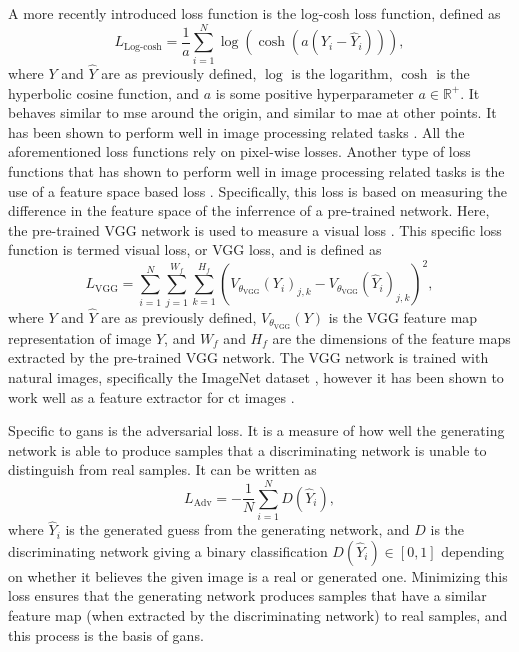 
A more recently introduced loss function is the log-cosh loss function, defined as \cite{chen2019log}
\begin{equation}
    \label{eq:losslogcosh}
    L_{\text{Log-cosh}} = \frac{1}{a} \sum_{i=1}^N \log ( \cosh ( a ( Y_i - \hat{Y}_i))),
\end{equation}
where $Y$ and $\hat{Y}$ are as previously defined, $\log$ is the logarithm, $\cosh$ is the hyperbolic cosine function, and $a$ is some positive hyperparameter $a \in \mathbb{R}^+$. It behaves similar to \acrshort{mse} around the origin, and similar to \acrshort{mae} at other points. It has been shown to perform well in image processing related tasks \cite{7797130}.
All the aforementioned loss functions rely on pixel-wise losses. Another type of loss functions that has shown to perform well in image processing related tasks is the use of a feature space based loss \cite{vggloss}. Specifically, this loss is based on measuring the difference in the feature space of the inferrence of a pre-trained network. Here, the pre-trained VGG network is used to measure a visual loss \cite{simonyan2015deep}. This specific loss function is termed visual loss, or VGG loss, and is defined as \cite{vggloss,liu2020tomogan}
\begin{equation}
    \label{eq:lossvgg}
    L_{\text{VGG}} = \sum_{i=1}^{N} \sum_{j=1}^{W_f} \sum_{k=1}^{H_f} \left(V_{\theta_{\text{VGG}}} (Y_i)_{j,k} - V_{\theta_{\text{VGG}}} (\hat{Y}_i)_{j,k} \right)^2,
\end{equation}
where $Y$ and $\hat{Y}$ are as previously defined, $V_{\theta_{\text{VGG}}}(Y)$ is the VGG feature map representation of image $Y$, and $W_f$ and $H_f$ are the dimensions of the feature maps extracted by the pre-trained VGG network. The VGG network is trained with natural images, specifically the ImageNet dataset \cite{deng2009imagenet}, however it has been shown to work well as a feature extractor for \acrshort{ct} images \cite{8340157}. 

Specific to \acrshort{gan}s is the adversarial loss. It is a measure of how well the generating network is able to produce samples that a discriminating network is unable to distinguish from real samples. It can be written as \cite{liu2020tomogan}
\begin{equation}
    \label{eq:lossadv}
    L_{\text{Adv}} = -\frac{1}{N} \sum_{i=1}^{N} D\left(  \hat{Y}_i \right),
\end{equation}
where $\hat{Y}_i$ is the generated guess from the generating network, and $D$ is the discriminating network giving a binary classification $D\left(\hat{Y}_i \right) \in [0,1]$ depending on whether it believes the given image is a real or generated one. Minimizing this loss ensures that the generating network produces samples that have a similar feature map (when extracted by the discriminating network) to real samples, and this process is the basis of \acrshort{gan}s. 


